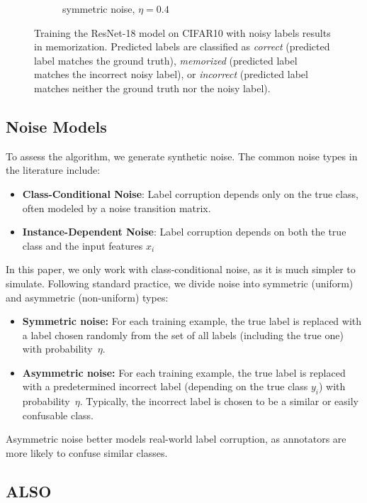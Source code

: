 \documentclass[12pt]{article}
\begin{document}
\begin{figure}[htbp]
\begin{subfigure}[b]{0.45\textwidth}
    \caption{symmetric noise, $\eta=0.4$}
    \label{fig:sub2}
  \end{subfigure}
  \caption{Training the ResNet-18 model on CIFAR10 with noisy labels results in memorization. Predicted labels are classified as \textit{correct} (predicted label matches the ground truth), \textit{memorized} (predicted label matches the incorrect noisy label), or \textit{incorrect} (predicted label matches neither the ground truth nor the noisy label).}
  \label{fig:memorization}
\end{figure}



\subsection{Noise Models}
To assess the algorithm, we generate synthetic noise.
The common noise types in the literature include:
\begin{itemize}
    \item \textbf{Class-Conditional Noise}: Label corruption depends only on the true class, often modeled by a noise transition matrix.
    \item \textbf{Instance-Dependent Noise}: Label corruption depends on both the true class and the input features $x_i$ \citep{prog_noise_iclr2021}
\end{itemize}


In this paper, we only work with class-conditional noise, as it is much simpler to simulate. Following standard practice, we divide noise into symmetric (uniform) and asymmetric (non-uniform) types:

\begin{itemize}
    \item \textbf{Symmetric noise:} For each training example, the true label is replaced with a label chosen randomly from the set of all labels (including the true one) with probability~$\eta$.
    \item \textbf{Asymmetric noise:} For each training example, the true label is replaced with a predetermined incorrect label (depending on the true class $y_i$) with probability~$\eta$. Typically, the incorrect label is chosen to be a similar or easily confusable class.
\end{itemize}

Asymmetric noise better models real-world label corruption, as annotators are more likely to confuse similar classes.

\subsection{ALSO}
\end{document}
